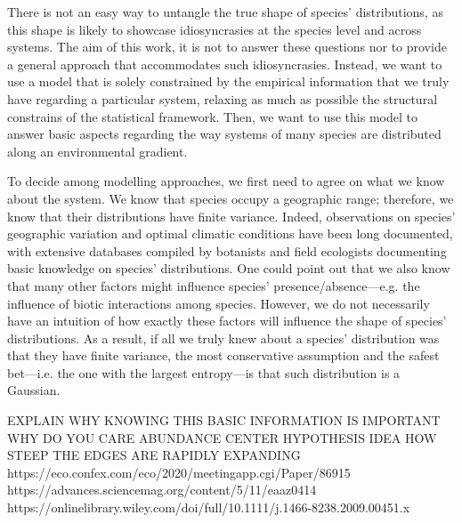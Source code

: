 \documentclass[11pt, a4paper]{article}
\begin{document}
There is not an easy way to untangle the true shape of species' distributions, as this shape is likely to showcase idiosyncrasies at the species level and across systems. The aim of this work, it is not to answer these questions nor to provide a general approach that accommodates such idiosyncrasies. Instead, we want to use a model that is solely constrained by the empirical information that we truly have regarding a particular system, relaxing as much as possible the structural constrains of the statistical framework. Then, we want to use this model to answer basic aspects regarding the way systems of many species are distributed along an environmental gradient. 

To decide among modelling approaches, we first need to agree on what we know about the system. We know that species occupy a geographic range; therefore, we know that their distributions have finite variance. Indeed, observations on species' geographic variation and optimal climatic conditions have been long documented, with extensive databases compiled by botanists and field ecologists documenting basic knowledge on species' distributions. One could point out that we also know that many other factors might influence species' presence/absence---e.g. the influence of biotic interactions among species. However, we do not necessarily have an intuition of how exactly these factors will influence the shape of species' distributions. As a result, if all we truly knew about a species' distribution was that they have finite variance, the most conservative assumption and the safest bet---i.e. the one with the largest entropy---is that such distribution is a Gaussian.


EXPLAIN WHY KNOWING THIS BASIC INFORMATION IS IMPORTANT 
WHY DO YOU CARE
ABUNDANCE CENTER HYPOTHESIS IDEA
HOW STEEP THE EDGES ARE RAPIDLY EXPANDING
https://eco.confex.com/eco/2020/meetingapp.cgi/Paper/86915
https://advances.sciencemag.org/content/5/11/eaaz0414
https://onlinelibrary.wiley.com/doi/full/10.1111/j.1466-8238.2009.00451.x



\end{document}
